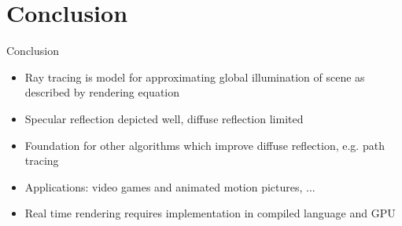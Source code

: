\section{Conclusion}

\begin{frame}{Conclusion}
\begin{itemize}
    \item Ray tracing is model for approximating global illumination of scene as described by rendering equation
    \pause
    \item Specular reflection depicted well, diffuse reflection limited
    \pause
    \item Foundation for other algorithms which improve diffuse reflection, e.g. path tracing
    \pause
    \item Applications: video games and animated motion pictures, ...
    \pause
    \item Real time rendering requires implementation in compiled
    language and GPU
\end{itemize}
\end{frame}
